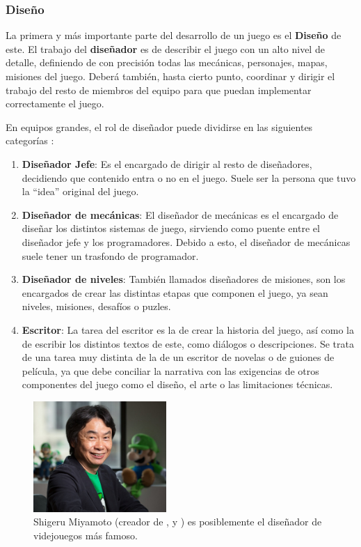 \subsubsection{Diseño}
La primera y más importante parte del desarrollo de un juego es el \textbf{Diseño} de este. El trabajo del \textbf{diseñador} es de describir el juego con un alto nivel de detalle, definiendo de con precisión todas las mecánicas, personajes, mapas, misiones del juego. Deberá también, hasta cierto punto, coordinar y dirigir el trabajo del resto de miembros del equipo para que puedan implementar correctamente el juego. 

En equipos grandes, el rol de diseñador puede dividirse en las siguientes categorías \cite{development_and_production}:
\begin{enumerate}
\item \textbf{Diseñador Jefe}: Es el encargado de dirigir al resto de diseñadores, decidiendo que contenido entra o no en el juego. Suele ser la persona que tuvo la ``idea'' original del juego.
\item \textbf{Diseñador de mecánicas}: El diseñador de mecánicas es el encargado de diseñar los distintos sistemas de juego, sirviendo como puente entre el diseñador jefe y los programadores. Debido a esto, el diseñador de mecánicas suele tener un trasfondo de programador.
\item \textbf{Diseñador de niveles}: También llamados diseñadores de misiones, son los encargados de crear las distintas etapas que componen el juego, ya sean niveles, misiones, desafíos o puzles.
\item \textbf{Escritor}: La tarea del escritor es la de crear la historia del juego, así como la de escribir los distintos textos de este, como diálogos o descripciones. Se trata de una tarea muy distinta de la de un escritor de novelas o de guiones de película, ya que debe conciliar la narrativa con las exigencias de otros componentes del juego como el diseño, el arte o las limitaciones técnicas.
\end{enumerate}
\begin{figure}[h]
    \centering
    \includegraphics[width=0.45\textwidth]{images/estadodelarte/desarrollo/shigeru-miyamoto}
    \caption{Shigeru Miyamoto (creador de ,  y ) es posiblemente el diseñador de videjouegos más famoso.}
\end{figure}

